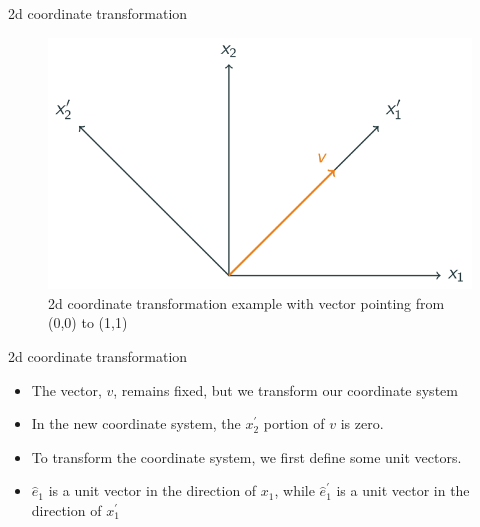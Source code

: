 \documentclass[12pt,handout]{beamer}
\providecommand{\tightlist}{%
  \setlength{\itemsep}{0pt}\setlength{\parskip}{0pt}}
\let\Oldincludegraphics\includegraphics
\renewcommand{\includegraphics}[2][]{\Oldincludegraphics[width=\textwidth,height=0.7\textheight,keepaspectratio]{#2}}
\begin{document}
\begin{frame}{2d coordinate transformation}
\protect\hypertarget{d-coordinate-transformation}{}
\begin{figure}
\centering
\includegraphics{../images/transform2d.svg}
\caption{2d coordinate transformation example with vector pointing from
(0,0) to (1,1)}
\end{figure}
\end{frame}

\begin{frame}{2d coordinate transformation}
\protect\hypertarget{d-coordinate-transformation-1}{}
\begin{itemize}
\tightlist
\item
  The vector, \(v\), remains fixed, but we transform our coordinate
  system
\item
  In the new coordinate system, the \(x_2^\prime\) portion of \(v\) is
  zero.
\item
  To transform the coordinate system, we first define some unit vectors.
\item
  \(\hat{e}_1\) is a unit vector in the direction of \(x_1\), while
  \(\hat{e}_1^\prime\) is a unit vector in the direction of
  \(x_1^\prime\)
\end{itemize}
\end{frame}
\end{document}
